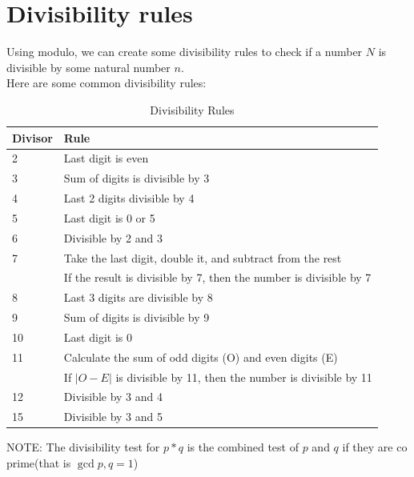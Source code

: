 \section{Divisibility rules}
Using modulo, we can create some divisibility rules to check if a number $N$ is divisible by some natural number $n$.\\
Here are some common divisibility rules:\\
\begin{theorem}
\begin{table}[h]
\centering
\caption{Divisibility Rules}
\begin{tabular}{@{}ll@{}}
\toprule
Divisor & Rule \\
\midrule
2 & Last digit is even \\
3 & Sum of digits is divisible by 3 \\
4 & Last 2 digits divisible by 4 \\
5 & Last digit is 0 or 5 \\
6 & Divisible by 2 and 3 \\
7 & Take the last digit, double it, and subtract from the rest \\
  & If the result is divisible by 7, then the number is divisible by 7 \\
8 & Last 3 digits are divisible by 8 \\
9 & Sum of digits is divisible by 9 \\
10 & Last digit is 0 \\
11 & Calculate the sum of odd digits (O) and even digits (E) \\
   & If $|O - E|$ is divisible by 11, then the number is divisible by 11 \\
12 & Divisible by 3 and 4 \\
15 & Divisible by 3 and 5 \\
\bottomrule
\end{tabular}
\end{table}
NOTE: The divisibility test for $p*q$ is the combined test of $p$ and $q$ if they are co prime(that is $\gcd{p,q}=1$)
\end{theorem}
